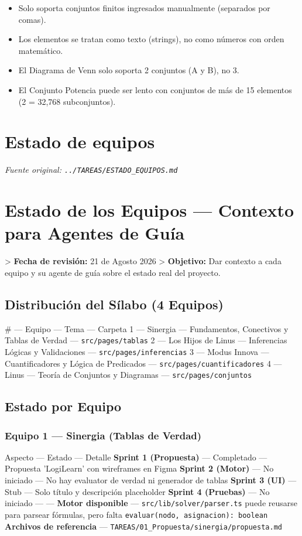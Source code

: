 \documentclass[11pt,a4paper,openany]{book}
\begin{document}
\begin{itemize}[leftmargin=*]
\item Solo soporta conjuntos finitos ingresados manualmente (separados por comas).
\item Los elementos se tratan como texto (strings), no como números con orden matemático.
\item El Diagrama de Venn solo soporta 2 conjuntos (A y B), no 3.
\item El Conjunto Potencia puede ser lento con conjuntos de más de 15 elementos (2 = 32,768 subconjuntos).
\end{itemize}


\section{Estado de equipos}
\textit{Fuente original: \texttt{../TAREAS/ESTADO\_EQUIPOS.md}}

\section{Estado de los Equipos --- Contexto para Agentes de Guía}

> \textbf{Fecha de revisión:} 21 de Agosto 2026
> \textbf{Objetivo:} Dar contexto a cada equipo y su agente de guía sobre el estado real del proyecto.

\hrulefill

\subsection{Distribución del Sílabo (4 Equipos)}

\# --- Equipo --- Tema --- Carpeta
1 --- Sinergia --- Fundamentos, Conectivos y Tablas de Verdad --- \texttt{src/pages/tablas}
2 --- Los Hijos de Linus --- Inferencias Lógicas y Validaciones --- \texttt{src/pages/inferencias}
3 --- Modus Innova --- Cuantificadores y Lógica de Predicados --- \texttt{src/pages/cuantificadores}
4 --- Linus --- Teoría de Conjuntos y Diagramas --- \texttt{src/pages/conjuntos}

\hrulefill

\subsection{Estado por Equipo}

\subsubsection{Equipo 1 --- Sinergia (Tablas de Verdad)}
Aspecto --- Estado --- Detalle
\textbf{Sprint 1 (Propuesta)} --- Completado --- Propuesta 'LogiLearn' con wireframes en Figma
\textbf{Sprint 2 (Motor)} --- No iniciado --- No hay evaluator de verdad ni generador de tablas
\textbf{Sprint 3 (UI)} --- Stub --- Solo título y descripción placeholder
\textbf{Sprint 4 (Pruebas)} --- No iniciado --- ---
\textbf{Motor disponible} --- \texttt{src/lib/solver/parser.ts} puede reusarse para parsear fórmulas, pero falta \texttt{evaluar(nodo, asignacion): boolean}
\textbf{Archivos de referencia} --- \texttt{TAREAS/01\_Propuesta/sinergia/propuesta.md}
\end{document}
